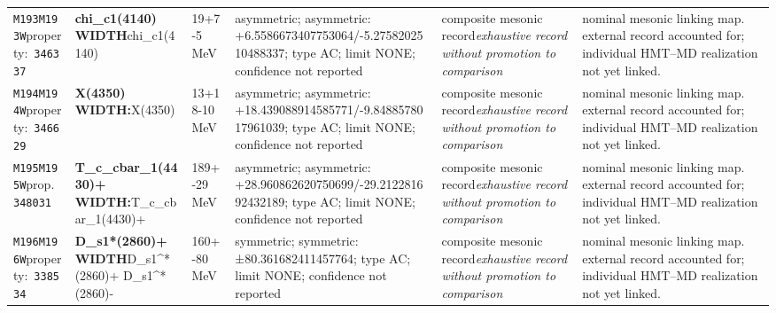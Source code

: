 \begin{landscape}
\begin{longtable}{L{1.85cm}L{4.45cm}L{2.35cm}L{4.05cm}L{3.35cm}L{7.15cm}}
\texttt{M193}\newline \texttt{M193W}\newline property:\ \texttt{346337} & \textbf{chi\_\allowbreak{}c1(4140) WIDTH}\newline chi\_\allowbreak{}c1(4140) & 19+7-5\,MeV & asymmetric; asymmetric: +6.5586673407753064/-5.2758202510488337; type AC; limit NONE; confidence not reported & composite mesonic record\newline \emph{exhaustive record without promotion to comparison} & nominal mesonic linking map. external record accounted for; individual HMT--MD realization not yet linked. \\
\texttt{M194}\newline \texttt{M194W}\newline property:\ \texttt{346629} & \textbf{X(4350) WIDTH:}\newline X(4350) & 13+18-10\,MeV & asymmetric; asymmetric: +18.439088914585771/-9.8488578017961039; type AC; limit NONE; confidence not reported & composite mesonic record\newline \emph{exhaustive record without promotion to comparison} & nominal mesonic linking map. external record accounted for; individual HMT--MD realization not yet linked. \\
\texttt{M195}\newline \texttt{M195W}\newline prop.\ \texttt{348031} & \textbf{T\_\allowbreak{}c\_\allowbreak{}cbar\_\allowbreak{}1(4430)+ WIDTH:}\newline T\_\allowbreak{}c\_\allowbreak{}cbar\_\allowbreak{}1(4430)+ & 189+-29\,MeV & asymmetric; asymmetric: +28.960862620750699/-29.212281692432189; type AC; limit NONE; confidence not reported & composite mesonic record\newline \emph{exhaustive record without promotion to comparison} & nominal mesonic linking map. external record accounted for; individual HMT--MD realization not yet linked. \\
\texttt{M196}\newline \texttt{M196W}\newline property:\ \texttt{338534} & \textbf{D\_\allowbreak{}s1*(2860)+ WIDTH}\newline D\_\allowbreak{}s1\textasciicircum{}*(2860)+ \textbar{}\allowbreak{} D\_\allowbreak{}s1\textasciicircum{}*(2860)- & 160+-80\,MeV & symmetric; symmetric: ±80.361682411457764; type AC; limit NONE; confidence not reported & composite mesonic record\newline \emph{exhaustive record without promotion to comparison} & nominal mesonic linking map. external record accounted for; individual HMT--MD realization not yet linked. \\

\end{longtable}
\end{landscape}
